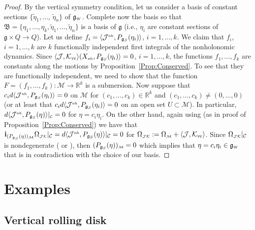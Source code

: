 \documentclass[10pt,a4paper]{amsart}
\numberwithin{equation}{section}
\def\W{\mathcal{W}}
\def\M{\mathcal{M}}
\def\J{\mathcal{J}}
\def\C{\mathcal{C}}
\def\R{\mathbb{R}}
\def\g{\mathfrak{g}}
\def\nh{{\mbox{\tiny{nh}}}}
\def\subW{{\mbox{\tiny{$\W$}}}}
\def\subC{{\mbox{\tiny{$\C$}}}}
\def\subM{{\mbox{\tiny{$\M$}}}}
\def\subWW{{\mbox{\tiny{$W$}}}}
\begin{document}
\begin{proof}
  By the vertical symmetry condition,  let us consider a basis of constant sections
  $\{\tilde \eta_1, \dots$, $\tilde \eta_n\}$ of $\g_\subWW$. Complete now the basis
  so that $\mathfrak{B} = \{\eta_1,\dots, \eta_k , \tilde \eta_1, \dots , \tilde \eta_n\}$
  is a basis of $\g$ (i.e., $\eta_i$ are constant sections of $\g\times Q\to Q$).
  Let us def\/ine $f_i = \langle \J^\nh, P_{\g_S}(\eta_i)\rangle$, $i=1,\ldots, k$.
  We claim that $f_i$, $i=1,\ldots, k$ are $k$ functionally independent f\/irst
  integrals of the nonholonomic dynamics.
  Since $\langle \J,\mathcal{K}_\subW\rangle(X_\nh, P_{\g_S}(\eta_i) \rangle = 0$, $i=1,\ldots, k$,
  the functions $f_1, \ldots, f_k$ are constants along the motions by Proposition~\ref{Prop:Conserved}.
  To see that they are functionally independent, we need to show that the function
  $F= (f_1,\dots , f_k)\colon \M\longrightarrow \R^k$ is a submersion. Now suppose that
  $c_i  d\langle \J^\nh , P_{\g_S}(\eta_i) \rangle = 0$ on $\M$ for $(c_1,\dots , c_k)\in\R^k$ and
  $(c_1,\ldots, c_k)\ne (0,\ldots, 0)$ (or at least that $c_i d\langle \J^\nh , P_{\g_S}(\eta_i)\rangle = 0$
  on an open set $U\subset \M$). In particular, $d\langle \J^\nh , P_{\g_S}(\eta)\rangle|_\subC = 0$ for $\eta= c_i  \eta_i$.
  On the other hand, again using \cite[Theorem~6.5(ii)]{Paula} (as in proof of Proposition~\ref{Prop:Conserved}) we have that ${\bf i}_{( P_{\mathfrak{g}_S}(\eta))_\subM} \Omega_{\mbox{\tiny{${\mathcal J} {\mathcal K}$}}} |_\C= d\langle \J^\nh , P_{\g_S}(\eta)\rangle|_\C = 0 $ for $\Omega_{\mbox{\tiny{${\mathcal J} {\mathcal K}$}}} := \Omega_\subM + \langle \mathcal{J},\mathcal{K}_\subW\rangle$.  Since $ \Omega_{\mbox{\tiny{${\mathcal J} {\mathcal K}$}}} |_\C$ is nondegenerate (\cite[Section~5.1]{Paula} or \cite[Proposition~3]{PL2011}), then $(P_{\g_S}(\eta))_\subM = 0$ which implies that $\eta = c_i  \eta_i\in \g_\subWW$ that is in contradiction with the choice of our basis.
\end{proof}


\section{Examples}\label{S:Examples}

\subsection{Vertical rolling disk}\label{Ex:Disk}
\end{document}
